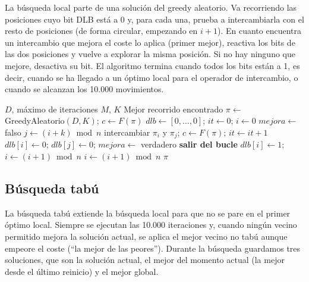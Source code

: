 La búsqueda local parte de una solución del greedy aleatorio. Va recorriendo las posiciones cuyo bit DLB está a 0 y, para cada una, prueba a intercambiarla con el resto de posiciones (de forma circular, empezando en $i+1$). En cuanto encuentra un intercambio que mejora el coste lo aplica (primer mejor), reactiva los bits de las dos posiciones y vuelve a explorar la misma posición. Si no hay ninguno que mejore, desactiva su bit. El algoritmo termina cuando todos los bits están a 1, es decir, cuando se ha llegado a un óptimo local para el operador de intercambio, o cuando se alcanzan los 10.000 movimientos.

\begin{algorithm}[H]
\caption{Búsqueda local del primer mejor con DLB}
\begin{algorithmic}[1]
\Require $D$, máximo de iteraciones $M$, $K$
\Ensure Mejor recorrido encontrado
\State $\pi \gets$ GreedyAleatorio$(D, K)$; \quad $c \gets F(\pi)$
\State $dlb \gets [0, \dots, 0]$; \quad $it \gets 0$; \quad $i \gets 0$
        \State $mejora \gets$ falso
            \State $j \gets (i + k) \bmod n$
                \State intercambiar $\pi_i$ y $\pi_j$; \quad $c \gets F(\pi)$; \quad $it \gets it + 1$
                \State $dlb[i] \gets 0$; \quad $dlb[j] \gets 0$; \quad $mejora \gets$ verdadero
                \State \textbf{salir del bucle} 
            \EndIf
        \EndFor
            \State $dlb[i] \gets 1$; \quad $i \gets (i+1) \bmod n$
        \EndIf
    \Else
        \State $i \gets (i+1) \bmod n$
    \EndIf
\EndWhile
\State \Return $\pi$
\end{algorithmic}
\end{algorithm}

\subsection{Búsqueda tabú}

La búsqueda tabú extiende la búsqueda local para que no se pare en el primer óptimo local. Siempre se ejecutan las 10.000 iteraciones y, cuando ningún vecino permitido mejora la solución actual, se aplica el mejor vecino no tabú aunque empeore el coste (``la mejor de las peores''). Durante la búsqueda guardamos tres soluciones, que son la solución actual, el mejor del momento actual (la mejor desde el último reinicio) y el mejor global.

